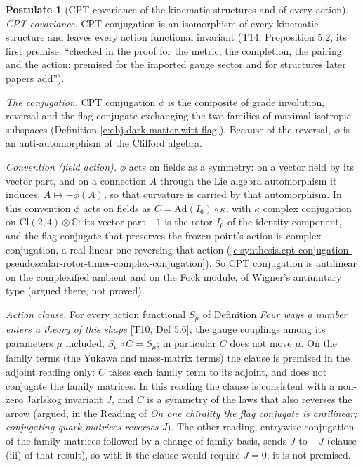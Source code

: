 \documentclass[11pt]{article}
\theoremstyle{definition}
\newtheorem{postulate}[theorem]{Postulate}
\theoremstyle{plain}
\newcommand{\changedmark}[2]{\marginpar{\raggedright\scriptsize\color{#1}#2}}
\providecommand{\C}{}\renewcommand{\C}{\mathbb{C}}
\providecommand{\Cl}{}\renewcommand{\Cl}{\mathrm{Cl}}
\begin{document}
\begin{postulate}[CPT covariance of the kinematic structures and of every action]\label{c:dark-matter.premise-cpt-covariance}
\changedmark{BurntOrange}{changed since the deposit}
\emph{CPT covariance.} CPT conjugation is an isomorphism of every kinematic structure and leaves every action functional invariant (T14, Proposition 5.2, its first premise: ``checked in the proof for the metric, the completion, the pairing and the action; premised for the imported gauge sector and for structures later papers add'').

\emph{The conjugation.} CPT conjugation $\phi$ is the composite of grade involution, reversal and the flag conjugate exchanging the two families of maximal isotropic subspaces (Definition \ref{c:obj.dark-matter.witt-flag}). Because of the reversal, $\phi$ is an anti-automorphism of the Clifford algebra.

\emph{Convention (field action).} $\phi$ acts on fields as a symmetry: on a vector field by its vector part, and on a connection $A$ through the Lie algebra automorphism it induces, $A \mapsto -\phi(A)$, so that curvature is carried by that automorphism. In this convention $\phi$ acts on fields as $C = \mathrm{Ad}(I_{6}) \circ \kappa$, with $\kappa$ complex conjugation on $\Cl(2,4) \otimes \C$: its vector part $-1$ is the rotor $I_{6}$ of the identity component, and the flag conjugate that preserves the frozen point's action is complex conjugation, a real-linear one reversing that action (\ref{c:synthesis.cpt-conjugation-pseudoscalar-rotor-times-complex-conjugation}). So CPT conjugation is antilinear on the complexified ambient and on the Fock module, of Wigner's antiunitary type (argued there, not proved).

\emph{Action clause.} For every action functional $S_{\mu}$ of Definition \emph{Four ways a number enters a theory of this shape} [T10, Def 5.6], the gauge couplings among its parameters $\mu$ included, $S_{\mu} \circ C = S_{\mu}$; in particular $C$ does not move $\mu$. On the family terms (the Yukawa and mass-matrix terms) the clause is premised in the adjoint reading only: $C$ takes each family term to its adjoint, and does not conjugate the family matrices. In this reading the clause is consistent with a non-zero Jarlskog invariant $J$, and $C$ is a symmetry of the laws that also reverses the arrow (argued, in the Reading of \emph{On one chirality the flag conjugate is antilinear; conjugating quark matrices reverses J}). The other reading, entrywise conjugation of the family matrices followed by a change of family basis, sends $J$ to $-J$ (clause (iii) of that result), so with it the clause would require $J = 0$; it is not premised.


\end{postulate}
\end{document}
